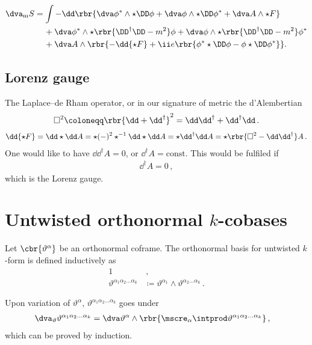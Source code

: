 \documentclass[a4paper]{article}
\begin{document}
\begin{align}
\dva_{\text{m}} S &=
\int -\dd\rbr{\dva\phi^*\wedge\star\DD\phi +
\dva\phi\wedge\star\DD\phi^* + \dva A \wedge\star F}
\nonumber \\
&\quad\,+
\dva\phi^*\wedge\star\rbr{\DD^{\dagger}\DD-m^2}\phi +
\dva\phi\wedge\star\rbr{\DD^{\dagger}\DD-m^2}\phi^*
\nonumber \\
&\quad\,+
\dva A\wedge\rbr{-\dd{\star F} +
	\ii e \rbr{\phi^* \star\DD\phi - \phi \star\DD\phi^*}}.
\end{align}

\subsection{Lorenz gauge}
The Laplace--de Rham operator, or in our signature of metric the d'Alembertian
\begin{align}
\square^2 \coloneqq \rbr{\dd + \dd^{\dagger}}^2 =
	\dd \dd^{\dagger} + \dd^{\dagger} \dd\,.
\end{align}
\begin{align}
\dd{\star F} = \dd\star \dd A = \star (-)^2 \star^{-1}\dd\star\dd A =
	\star \dd^{\dagger} \dd A = \star\rbr{\square^2 - \dd \dd^{\dagger}} A\,.
\end{align}
One would like to have $\dd \dd^{\dagger} A = 0$, or $\dd^{\dagger} A = 
\text{const}$. This would be fulfiled if
\begin{align}
\dd^{\dagger} A = 0\,,
\end{align}
which is the Lorenz gauge\cite{Lorenz1867,Bladel1991a,Bladel1991b}.

\section{Untwisted orthonormal $k$-cobases}
Let $\cbr{\vartheta^{\alpha}}$ be an orthonormal coframe. The orthonormal 
basis for untwisted $k$-form is defined inductively as
\begin{align}
1&\,, \\
\vartheta^{\alpha_{1}\alpha_{2}\ldots \alpha_{k}} &\coloneqq 
	\vartheta^{\alpha_{1}} \wedge \vartheta^{\alpha_{2}\ldots \alpha_{k}}\,.
\end{align}

Upon variation of $\vartheta^{\alpha}$, $\vartheta^{\alpha_{1}\alpha_{2}\ldots 
\alpha_{k}}$ goes under
\begin{align}
\dva_{\vartheta} \vartheta^{\alpha_{1}\alpha_{2}\ldots \alpha_{k}} &=
\dva \vartheta^{\alpha} \wedge \rbr{\mscre_{\alpha}\intprod 
	\vartheta^{\alpha_{1}\alpha_{2}\ldots \alpha_{k}}}\,,
\end{align}
which can be proved by induction.
\end{document}
